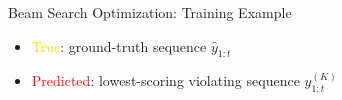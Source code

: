 \begin{frame}[fragile]{Beam Search Optimization: Training Example}
\begin{center}
\begin{tikzpicture}[transform canvas = {scale=0.8}]
\end{tikzpicture}
  \end{center}
  \air
  \air
  \air

  \begin{itemize}
  \item \textcolor{gold}{True}: ground-truth sequence $\hat{y}_{1:t}$
  \item<4-> \textcolor{red}{Predicted}: lowest-scoring violating sequence  $y_{1:t}^{(K)}$
  \end{itemize}
\end{frame}

